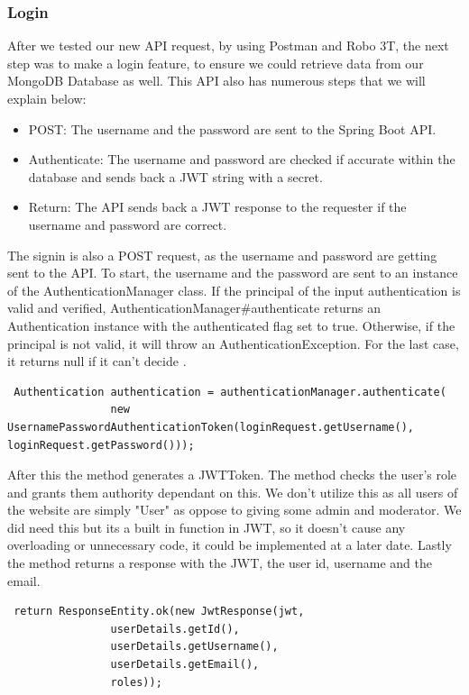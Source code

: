 \subsubsection{Login}
After we tested our new API request, by using Postman and Robo 3T, the next step was to make a login feature, to ensure we could retrieve data from our MongoDB Database as well. This API also has numerous steps that we will explain below: \par
\begin{itemize}
    \item POST: The username and the password are sent to the Spring Boot API.
    \item Authenticate: The username and password are checked if accurate within the database and sends back a JWT string with a secret.
    \item Return: The API sends back a JWT response to the requester if the username and password are correct.
\end{itemize}
The signin is also a POST request, as the username and password are getting sent to the API. To start, the username and the password are sent to an instance of the AuthenticationManager class. If the principal of the input authentication is valid and verified, AuthenticationManager#authenticate returns an Authentication instance with the authenticated flag set to true. Otherwise, if the principal is not valid, it will throw an AuthenticationException. For the last case, it returns null if it can't decide \cite{Baeldung}. \par
\begin{verbatim}
 Authentication authentication = authenticationManager.authenticate(
                new UsernamePasswordAuthenticationToken(loginRequest.getUsername(), loginRequest.getPassword())); 
\end{verbatim}
\par After this the method generates a JWTToken. The method checks the user's role and grants them authority dependant on this. We don't utilize this as all users of the website are simply "User" as oppose to giving some admin and moderator. We did need this but its a built in function in JWT, so it doesn't cause any overloading or unnecessary code, it could be implemented at a later date. Lastly the method returns a response with the JWT, the user id, username and the email.\par
\begin{verbatim}
 return ResponseEntity.ok(new JwtResponse(jwt,
                userDetails.getId(),
                userDetails.getUsername(),
                userDetails.getEmail(),
                roles));
\end{verbatim}
